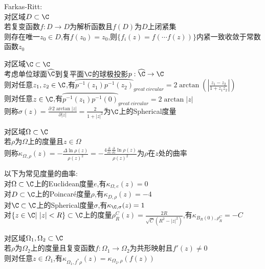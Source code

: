 \begin{dingli}
Farkas-Ritt:\\
对区域$D\subset \C$\\
若复变函数$f:D\to D$为解析函数且$f(D)$为$D$上闭紧集\\
则存在唯一$z_0\in D$,有$f(z_0)=z_0$,则$\{f_i(z)=f(\cdots f(z))\}$内紧一致收敛于常数函数$z_0$
\end{dingli}

\begin{dingyi}
对区域$\C\subset \C$\\
考虑单位球面$\widehat{\C}$到复平面$\C$的球极投影$p:\widehat{\C}\to\C$\\
则对任意$z_1,z_2\in\C$,有$\wideparen{p^{-1}(z_1)p^{-1}(z_2)}_{great\ circular}=2\arctan(|\frac{z_1-z_2}{1+z_1\overline{z_2}}|)$\\
则对任意$z\in\C$,有$\wideparen{p^{-1}(z_1)p^{-1}(0)}_{great\ circular}=2\arctan|z|$\\
则称$\sigma(z)=\frac{\partial\ 2\arctan|z|}{\partial |z|}=\frac{2}{1+|z|^2}$为$\C$上的Spherical度量
\end{dingyi}

\begin{dingyi}
对区域$\Omega\subset \C$\\
若$\rho$为$\Omega$上的度量且$z\in \Omega$\\
则称$\kappa_{\Omega,\rho}(z)=-\frac{\Delta\ln\rho(z)}{\rho(z)^2}=-\frac{4\frac{\partial}{\partial z}\frac{\partial}{\partial \overline{z}}\ln\rho(z)}{\rho(z)^2}$为$\rho$在$z$处的曲率
\end{dingyi}

\begin{zhu}
以下为常见度量的曲率:\\
对$\Omega\subset\C$上的Euclidean度量$e$,有$\kappa_{\Omega,e}(z)=0$\\
对$D\subset\C$上的Poincaré度量$\rho$,有$\kappa_{D,\rho}(z)=-4$\\
对$\C\subset\C$上的Spherical度量$\sigma$,有$\kappa_{\C,\sigma}(z)=1$\\
对$\{z\in\C|\ |z|<R\}\subset\C$上的度量$\rho_{R}^{C}(z)=\frac{2R}{\sqrt{C}(R^2-|z|^2)}$,有$\kappa_{B_R(0),\rho_{R}^{C}}=-C$
\end{zhu}

\begin{dingli}
对区域$\Omega_1,\Omega_2\subset\C$\\
若$\rho$为$\Omega_2$上的度量且复变函数$f:\Omega_1\to\Omega_2$为共形映射且$f'(z)\neq 0$\\
则对任意$z\in \Omega_1$,有$\kappa_{\Omega_1,f^*\rho}(z)=\kappa_{\Omega_2,\rho}(f(z))$
\end{dingli}

